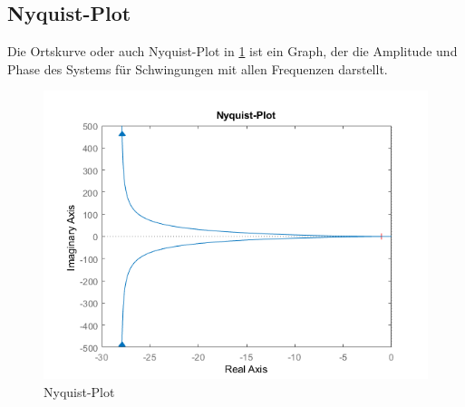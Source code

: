 \subsection{Nyquist-Plot}

Die Ortskurve oder auch Nyquist-Plot in \ref{fig:nyquist-plot} ist ein Graph, der die Amplitude und Phase des Systems für Schwingungen mit allen Frequenzen darstellt.

\begin{figure}[H]
	\centering
	\includegraphics[width=0.7\linewidth]{diagrams/nyquistDiagram.png}
	\caption[Nyquist-Plot]{Nyquist-Plot}
	\label{fig:nyquist-plot}
\end{figure}